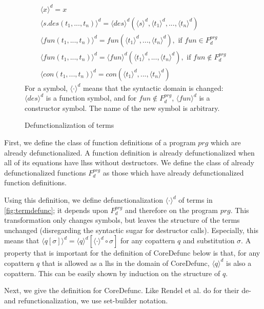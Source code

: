 \begin{figure}
\begin{align*}
\langle x \rangle^d = x \\
\langle s.des(t_1, ..., t_n) \rangle^d = \langle des \rangle^d (\langle s \rangle^d, \langle t_1 \rangle^d, ..., \langle t_n \rangle^d) \\
\langle fun(t_1, ..., t_n) \rangle^d = fun(\langle t_1 \rangle^d, ..., \langle t_n \rangle^d), \text{ if } fun \in F^{prg}_d \\
\langle fun(t_1, ..., t_n) \rangle^d = \langle fun \rangle^d (\langle t_1 \rangle^d, ..., \langle t_n \rangle^d), \text{ if } fun \not\in F^{prg}_d \\
\langle con(t_1, ..., t_n) \rangle^d = con(\langle t_1 \rangle^d, ..., \langle t_n \rangle^d)
\end{align*}
For a symbol, $\langle \cdot \rangle^d$ means that the syntactic domain is changed: $\langle des \rangle^d$ is a function symbol, and for $fun \not\in F^{prg}_d$, $\langle fun \rangle^d$ is a constructor symbol. The name of the new symbol is arbitrary.
\caption{Defunctionalization of terms}
\label{fig:termdefunc}
\end{figure}

First, we define the class of function definitions of a program $prg$ which are already defunctionalized. A function definition is already defunctionalized when all of its equations have lhss without destructors. We define the class of already defunctionalized functions $F^{prg}_d$ as those which have already defunctionalized function definitions.

Using this definition, we define defunctionalization $\langle \cdot \rangle^d$ of terms in \autoref{fig:termdefunc}; it depends upon $F^{prg}_d$ and therefore on the program $prg$. This transformation only changes symbols, but leaves the structure of the terms unchanged (disregarding the syntactic sugar for destructor calls). Especially, this means that $\langle q[\sigma] \rangle^d = \langle q \rangle^d [\langle \cdot \rangle^d \circ \sigma]$ for any copattern $q$ and substitution $\sigma$. A property that is important for the definition of \textsf{CoreDefunc} below is that, for any copattern $q$ that is allowed as a lhs in the domain of \textsf{CoreDefunc}, $\langle q \rangle^d$ is also a copattern. This can be easily shown by induction on the structure of $q$.

Next, we give the definition for \textsf{CoreDefunc}. Like Rendel et al. do for their de- and refunctionalization, we use set-builder notation.

